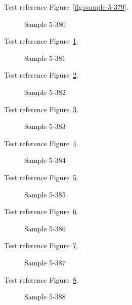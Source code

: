Test reference Figure~\ref{fig:sample-5-379}.

\begin{figure}[tbhp]
\caption{Sample 5-380}
\label{fig:sample-5-380}
\end{figure}

Test reference Figure~\ref{fig:sample-5-380}.

\begin{figure}[tbhp]
\caption{Sample 5-381}
\label{fig:sample-5-381}
\end{figure}

Test reference Figure~\ref{fig:sample-5-381}.

\begin{figure}[tbhp]
\caption{Sample 5-382}
\label{fig:sample-5-382}
\end{figure}

Test reference Figure~\ref{fig:sample-5-382}.

\begin{figure}[tbhp]
\caption{Sample 5-383}
\label{fig:sample-5-383}
\end{figure}

Test reference Figure~\ref{fig:sample-5-383}.

\begin{figure}[tbhp]
\caption{Sample 5-384}
\label{fig:sample-5-384}
\end{figure}

Test reference Figure~\ref{fig:sample-5-384}.

\begin{figure}[tbhp]
\caption{Sample 5-385}
\label{fig:sample-5-385}
\end{figure}

Test reference Figure~\ref{fig:sample-5-385}.

\begin{figure}[tbhp]
\caption{Sample 5-386}
\label{fig:sample-5-386}
\end{figure}

Test reference Figure~\ref{fig:sample-5-386}.

\begin{figure}[tbhp]
\caption{Sample 5-387}
\label{fig:sample-5-387}
\end{figure}

Test reference Figure~\ref{fig:sample-5-387}.

\begin{figure}[tbhp]
\caption{Sample 5-388}
\label{fig:sample-5-388}
\end{figure}

